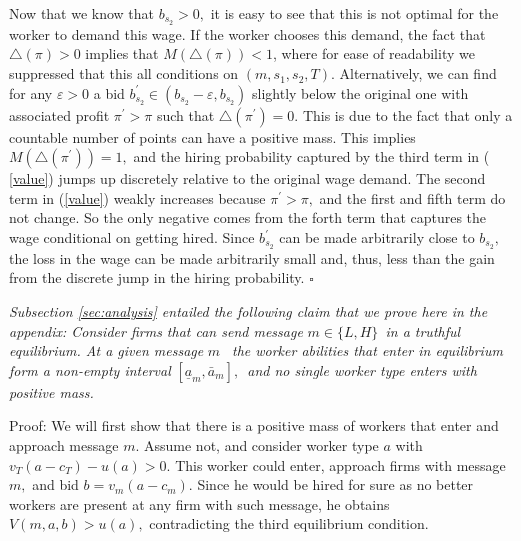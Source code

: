 \documentclass[12pt]{article}
\theoremstyle{plain}
\begin{document}
Now that we know that $b_{s_{2}}>0,$ it is easy to see that this is not
optimal for the worker to demand this wage. If the worker chooses this
demand, the fact that $\bigtriangleup (\pi )>0$ implies that $%
M(\bigtriangleup (\pi ))<1$, where for ease of readability we suppressed
that this all conditions on $(m,s_{1},s_{2},T).$ Alternatively, we can find
for any $\varepsilon >0$ a bid $b_{s_{2}}^{\prime }\in
(b_{s_{2}}-\varepsilon ,b_{s_{2}})$ slightly below the original one with
associated profit $\pi ^{\prime }>\pi $ such that $\bigtriangleup (\pi
^{\prime })=0.$ This is due to the fact that only a countable number of
points can have a positive mass. This implies $M(\bigtriangleup (\pi
^{\prime }))=1,$ and the hiring probability captured by the third term in (%
\ref{value}) jumps up discretely relative to the original wage demand$.$ The
second term in (\ref{value}) weakly increases because $\pi ^{\prime }>\pi ,$
and the first and fifth term do not change. So the only negative comes from
the forth term that captures the wage conditional on getting hired. Since $%
b_{s_{2}}^{\prime }$ can be made arbitrarily close to $b_{s_{2}},$ the loss
in the wage can be made arbitrarily small and, thus, less than the gain from
the discrete jump in the hiring probability. $\square $

\bigskip \bigskip

\noindent \textit{Subsection \ref{sec:analysis} entailed the following claim that we
prove here in the appendix: Consider firms that can send message }$m\in
\{L,H\}$\textit{\ in a truthful equilibrium. At a given message }$m$\textit{%
\ the worker abilities that enter in equilibrium form a non-empty interval }$%
[\underline{a}_{m},\bar{a}_{m}],$\textit{\ and no single worker type enters
with positive mass.}

Proof: We will first show that there is a positive mass of workers that
enter and approach message $m.$ Assume not, and consider worker type $a$
with $v_{T}(a-c_{T})-u\left( a\right) >0.$ This worker could enter, approach
firms with message $m,$ and bid $b=v_{m}(a-c_{m}).$ Since he would be hired
for sure as no better workers are present at any firm with such message, he
obtains $V(m,a,b)>u(a),$ contradicting the third equilibrium condition.
\end{document}

